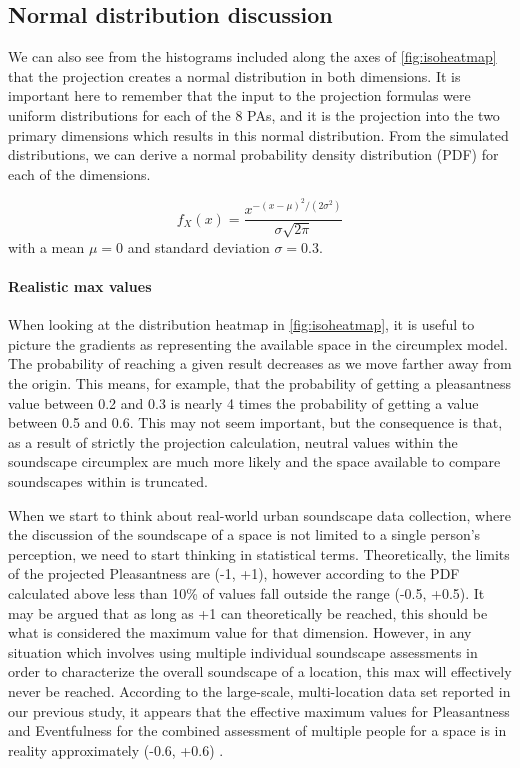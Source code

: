\subsection{Normal distribution discussion}

We can also see from the histograms included along the axes of \cref{fig:isoheatmap} that the projection creates a normal distribution in both dimensions. %
It is important here to remember that the input to the projection formulas were uniform distributions for each of the 8 PAs, and it is the projection into the two primary dimensions which results in this normal distribution.
From the simulated distributions, we can derive a normal probability density distribution (PDF) for each of the dimensions.

\[   f_X(x) = \frac{x^{-(x-\mu)^2/(2\sigma^2)}}{\sigma \sqrt{2\pi}}\]
with a mean $\mu = 0$ and standard deviation $\sigma = 0.3$.

\paragraph*{Realistic max values}
When looking at the distribution heatmap in \cref{fig:isoheatmap}, it is useful to picture the gradients as representing the available space in the circumplex model. The probability of reaching a given result decreases as we move farther away from the origin. This means, for example, that the probability of getting a pleasantness value between 0.2 and 0.3 is nearly 4 times the probability of getting a value between 0.5 and 0.6. This may not seem important, but the consequence is that, as a result of strictly the projection calculation, neutral values within the soundscape circumplex are much more likely and the space available to compare soundscapes within is truncated.

When we start to think about real-world urban soundscape data collection, where the discussion of the soundscape of a space is not limited to a single person's perception, we need to start thinking in statistical terms. Theoretically, the limits of the projected Pleasantness are (-1, +1), however according to the PDF calculated above less than 10\% of values fall outside the range (-0.5, +0.5).
It may be argued that as long as +1 can theoretically be reached, this should be what is considered the maximum value for that dimension. However, in any situation which involves using multiple individual soundscape assessments in order to characterize the overall soundscape of a location, this max will effectively never be reached. According to the large-scale, multi-location data set reported in our previous study, it appears that the effective maximum values for Pleasantness and Eventfulness for the combined assessment of multiple people for a space is in reality approximately (-0.6, +0.6) \citep{Lionello2021Introducing}.

